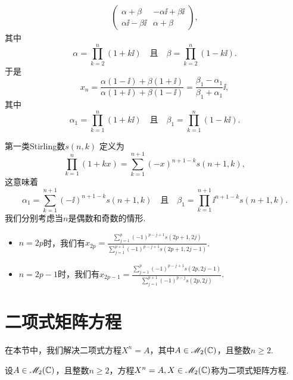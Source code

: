 \begin{solution}
\begin{inparaenum}[(a)]
\begin{align*}
\begin{pmatrix}
            \alpha + \beta & -\alpha \ii + \beta \ii \\
            \alpha \ii - \beta \ii & \alpha + \beta
          \end{pmatrix},
        \end{align*}
        其中
        \[
          \alpha = \prod_{k=2}^n(1 + k\ii) \quad \text{且} \quad
          \beta = \prod_{k=2}^n(1 - k\ii).
        \]
        于是
        \[
          x_n = \frac{\alpha(1-\ii) + \beta(1+\ii)}
          {\alpha(1+\ii) + \beta(1-\ii)} =
          \frac{\beta_1 - \alpha_1}{\beta_1 + \alpha_1} \ii,
        \]
        其中
        \[
          \alpha_1 = \prod_{k=1}^n(1 + k\ii) \quad \text{且} \quad
          \beta_1 = \prod_{k=1}^n(1 - k\ii).
        \]

        第一类Stirling数$s(n,k)$ \cite[p.56]{59} 定义为
        \[
          \prod_{k=1}^n (1 + kx) = \sum_{k=1}^{n+1}
          (-x)^{n+1-k}s(n+1,k),
        \]
        这意味着
        \[
          \alpha_1 = \sum_{k=1}^{n+1}(-\ii)^{n+1-k}
          s(n+1, k) \quad \text{且} \quad
          \beta_1 = \prod_{k=1}^{n+1}\ii^{n+1-k}
          s(n+1 , k).
        \]
        我们分别考虑当$n$是偶数和奇数的情形.
  \end{inparaenum}
  \begin{itemize}
          \item $n=2p$时，我们有$x_{2p}=
          \frac{\sum_{j=1}^p(-1)^{p-j+1}s(2p+1,2j)}
          {\sum_{j=1}^{p+1}(-1)^{p-j+1}s(2p+1,2j-1)}$.
          \item $n=2p-1$时，我们有$x_{2p-1}=
          \frac{\sum_{j=1}^p(-1)^{p-j+1}s(2p,2j-1)}
          {\sum_{j=1}^{p+1}(-1)^{p-j}s(2p,2j)}$.
        \end{itemize}
\end{solution}

\section{二项式矩阵方程}
在本节中，我们解决二项式方程$X^n=A$，其中$A\in\mathscr M_2(\mathbb C)$，且整数$n\ge2$.

\begin{definition}
  设$A\in\mathscr M_2(\mathbb C)$，且整数$n\ge2$，方程$X^n=A,X\in\mathscr M_2(\mathbb C)$称为{\kaishu 二项式矩阵方程}. 
\end{definition}

